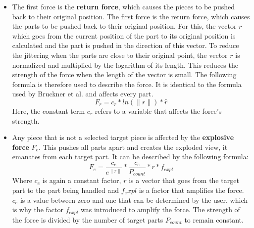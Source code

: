 \begin{itemize}
	\item The first force is the \textbf{return force}, which causes the pieces to be pushed back to their original position.
	The first force is the return force, which causes the parts to be pushed back to their original position. 
	For this, the vector $r$ which goes from the current position of the part to its original position is calculated and the part is pushed in the direction of this vector. 
	To reduce the jittering when the parts are close to their original point, the vector $r$ is normalized and multiplied by the logarithm of its length. 
	This reduces the strength of the force when the length of the vector is small. 
	The following formula is therefore used to describe the force. 
	It is identical to the formula used by Bruckner et al. and affects every part.
	\begin{equation}
		F_r = c_r * ln(\|r\|) * \hat{r}
		\label{eq:FB_return}
	\end{equation}
	Here, the constant term $c_r$ refers to a variable that affects the force's strength.
	
	\item Any piece that is not a selected target piece is affected by the \textbf{explosive force} $F_e$. This pushes all parts apart and creates the exploded view, it emanates from each target part. 
	It can be described by the following formula:
	\begin{equation}
		F_e = \frac{c_e}{e^{\|r\|}} * \frac{c_e}{P_{count}} * r * f_{expl}
		\label{eq:FB_explosion}
	\end{equation}
	Where $c_e$ is again a constant factor, $r$ is a vector that goes from the target part to the part being handled and $f_expl$ is a factor that amplifies the force. 
	$c_e$ is a value between zero and one that can be determined by the user, which is why the factor $f_{expl}$ was introduced to amplify the force. 
	The strength of the force is divided by the number of target parts $P_{count}$ to remain constant. 
	

\end{itemize}
